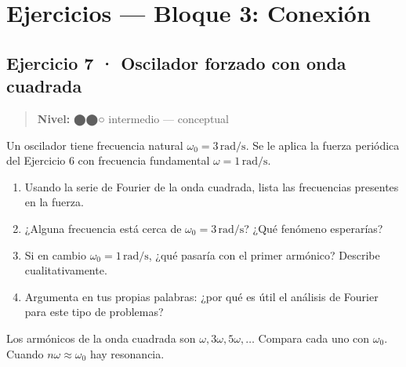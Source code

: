 \documentclass[
  letterpaper,
  DIV=11,
  numbers=noendperiod]{scrreprt}
\providecommand{\tightlist}{%
  \setlength{\itemsep}{0pt}\setlength{\parskip}{0pt}}
\begin{document}
\section{Ejercicios --- Bloque 3:
Conexión}\label{ejercicios-bloque-3-conexiuxf3n}

\subsection*{Ejercicio 7 · Oscilador forzado con onda
cuadrada}\label{ejercicio-7-oscilador-forzado-con-onda-cuadrada}

\begin{quote}
\textbf{Nivel:} ⬤⬤○ intermedio --- conceptual
\end{quote}

Un oscilador tiene frecuencia natural \(\omega_0 = 3\,\text{rad/s}\). Se
le aplica la fuerza periódica del Ejercicio 6 con frecuencia fundamental
\(\omega = 1\,\text{rad/s}\).

\begin{enumerate}
\def\labelenumi{\alph{enumi})}
\tightlist
\item
  Usando la serie de Fourier de la onda cuadrada, lista las frecuencias
  presentes en la fuerza.
\item
  ¿Alguna frecuencia está cerca de \(\omega_0 = 3\,\text{rad/s}\)? ¿Qué
  fenómeno esperarías?
\item
  Si en cambio \(\omega_0 = 1\,\text{rad/s}\), ¿qué pasaría con el
  primer armónico? Describe cualitativamente.
\item
  Argumenta en tus propias palabras: ¿por qué es útil el análisis de
  Fourier para este tipo de problemas?
\end{enumerate}

\begin{tcolorbox}[enhanced jigsaw, colbacktitle=quarto-callout-tip-color!10!white, toptitle=1mm, titlerule=0mm, rightrule=.15mm, colframe=quarto-callout-tip-color-frame, leftrule=.75mm, breakable, colback=white, bottomrule=.15mm, coltitle=black, bottomtitle=1mm, title=\textcolor{quarto-callout-tip-color}{\faLightbulb}\hspace{0.5em}{Pista}, arc=.35mm, toprule=.15mm, left=2mm, opacitybacktitle=0.6, opacityback=0]

Los armónicos de la onda cuadrada son
\(\omega, 3\omega, 5\omega, \ldots\) Compara cada uno con \(\omega_0\).
Cuando \(n\omega \approx \omega_0\) hay resonancia.

\end{tcolorbox}
\end{document}
